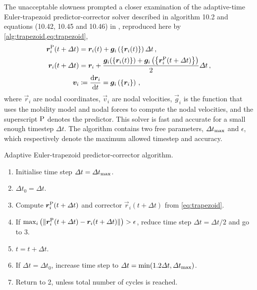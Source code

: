 The unacceptable slowness prompted a closer examination of the adaptive-time Euler-trapezoid predictor-corrector solver described in algorithm 10.2 and equations (10.42, 10.45 and 10.46) in \cite[p.~214--216]{ddlab}, reproduced here by \cref{alg:trapezoid,eq:trapezoid},
\begin{align}\label{eq:trapezoid}
    \vec{r}_i^{\rvar{P}}(t + \Delta t) & = \vec{r}_i(t) + \vec{g}_i\left(\left\{ \vec{r}_i(t) \right\}\right) \Delta t\,,                                                                     \\
    \vec{r}_i(t + \Delta t)            & = \vec{r}_i + \dfrac{\vec{g}_i(\left\{\vec{r}_i(t)\right\}) + \vec{g}_i\left(\left\{\vec{r}_i^{\rvar{P}}(t + \Delta t)\right\}\right)}{2}\Delta t\,, \\
    \vec{v}_i                          & \coloneqq \dfrac{\rvar{d}\vec{r}_i}{\rvar{d}t} = \vec{g}_i\left(\left\{\vec{r}_i\right\}\right)\,,
\end{align}
where $\vec{r}_i$ are nodal coordinates, $\vec{v}_i$ are nodal velocities, $\vec{g}_i$ is the function that uses the mobility model and nodal forces to compute the nodal velocities, and the superscript $\textrm{P}$ denotes the predictor. This solver is fast and accurate for a small enough timestep $\Delta t$. The algorithm contains two free parameters, $\Delta t_{\textrm{max}}$ and $\epsilon$, which respectively denote the maximum allowed timestep and accuracy.
\begin{algorithm}
    \caption{Adaptive Euler-trapezoid predictor-corrector algorithm.}
    \label{alg:trapezoid}
    \begin{enumerate}
        \item Initialise time step $\Delta t = \Delta t_{\textrm{max}}$.
        \item $\Delta t_0 = \Delta t$.
        \item Compute $\vec{r}_i^{\rvar{P}}(t + \Delta t)$ and corrector $\vec{r}_i(t + \Delta t)$ from \cref{eq:trapezoid}.
        \item If $\max_i\left(\lVert \vec{r}_i^{\rvar{P}}(t + \Delta t) - \vec{r}_i(t + \Delta t)\rVert\right) > \epsilon$, reduce time step $\Delta t = \Delta t / 2$ and go to 3.
        \item $t = t + \Delta t$.
        \item If $\Delta t = \Delta t_0$, increase time step to $\Delta t = \min(1.2 \Delta t, \Delta t_{\textrm{max}})$.
        \item Return to 2, unless total number of cycles is reached.
    \end{enumerate}
\end{algorithm}

